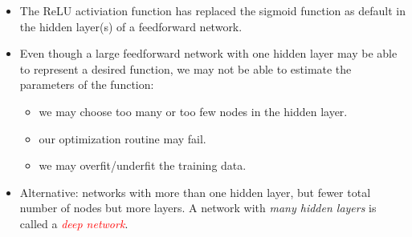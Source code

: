 \documentclass[10pt,ignorenonframetext,]{beamer}
\providecommand{\tightlist}{%
  \setlength{\itemsep}{0pt}\setlength{\parskip}{0pt}}
\begin{document}
\begin{frame}

\begin{itemize}
\tightlist
\item
  The ReLU activiation function has replaced the sigmoid function as
  default in the hidden layer(s) of a feedforward network.
\end{itemize}

\vspace{2mm}

\begin{itemize}
\tightlist
\item
  Even though a large feedforward network with one hidden layer may be
  able to represent a desired function, we may not be able to estimate
  the parameters of the function:

  \begin{itemize}
  \tightlist
  \item
    we may choose too many or too few nodes in the hidden layer.
  \item
    our optimization routine may fail.
  \item
    we may overfit/underfit the training data.
  \end{itemize}
\end{itemize}

\vspace{2mm}

\begin{itemize}
\tightlist
\item
  Alternative: networks with more than one hidden layer, but fewer total
  number of nodes but more layers. A network with \emph{many hidden
  layers} is called a \emph{\textcolor{red}{deep network}}.
\end{itemize}

\end{frame}
\end{document}
